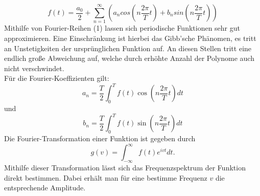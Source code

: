 \begin{equation} 
f(t) = \frac{a_0}{2} + \sum_{n=1}^\infty (a_n cos(n\frac{2\pi}{T}t) + b_n sin(n\frac{2\pi}{T}t)) 
\end{equation}
Mithilfe von Fourier-Reihen (1) lassen sich periodische Funktionen sehr gut approximieren. Eine Einschränkung ist hierbei das Gibb'sche Phänomen, es tritt an Unstetigkeiten der ursprünglichen Funktion auf. An diesen Stellen tritt eine endlich große Abweichung auf, welche durch erhöhte Anzahl der Polynome auch nicht verschwindet. \\
Für die Fourier-Koeffizienten gilt:
\begin{equation}
a_n = \frac{T}{2}\int_{0}^{T} f(t) \cos(n\frac{2\pi}{T}t) dt
\end{equation}
und
\begin{equation}
b_n = \frac{T}{2}\int_{0}^{T} f(t) \sin(n\frac{2\pi}{T}t) dt
\end{equation}
Die Fourier-Transformation einer Funktion ist gegeben durch
\begin{equation}
g(v) = \int_{-\infty}^{\infty} f(t) e^{ivt} dt.
\end{equation}
Mithilfe dieser Transformation lässt sich das Frequenzspektrum der Funktion direkt bestimmen. Dabei erhält man für eine bestimme Frequenz $v$ die entsprechende Amplitude.
